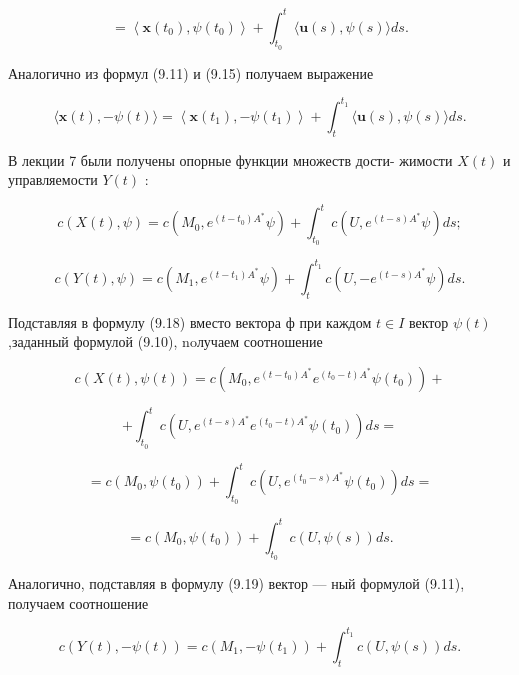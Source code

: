 \documentclass[8pt]{extarticle}
\begin{document}
\[
= \left\langle  {\mathbf{x}\left( {t}_{0}\right) ,\psi \left( {t}_{0}\right) }\right\rangle   + {\int }_{{t}_{0}}^{t}\langle \mathbf{u}\left( s\right) ,\psi \left( s\right) \rangle {ds}. \tag{9.16}
\]

Аналогично из формул (9.11) и (9.15) получаем выражение

\[
\langle \mathbf{x}\left( t\right) , - \psi \left( t\right) \rangle  = \left\langle  {\mathbf{x}\left( {t}_{1}\right) , - \psi \left( {t}_{1}\right) }\right\rangle   + {\int }_{t}^{{t}_{1}}\langle \mathbf{u}\left( s\right) ,\psi \left( s\right) \rangle {ds}. \tag{9.17}
\]

В лекции 7 были получены опорные функции множеств дости- жимости \(X\left( t\right)\) и управляемости \(Y\left( t\right)\) :

\[
c\left( {X\left( t\right) ,\psi }\right)  = c\left( {{M}_{0},{e}^{\left( {t - {t}_{0}}\right) {A}^{ * }}\psi }\right)  + {\int }_{{t}_{0}}^{t}c\left( {U,{e}^{\left( {t - s}\right) {A}^{ * }}\psi }\right) {ds}; \tag{9.18}
\]

\[
c\left( {Y\left( t\right) ,\psi }\right)  = c\left( {{M}_{1},{e}^{\left( {t - {t}_{1}}\right) {A}^{ * }}\psi }\right)  + {\int }_{t}^{{t}_{1}}c\left( {U, - {e}^{\left( {t - s}\right) {A}^{ * }}\psi }\right) {ds}. \tag{9.19}
\]

Подставляя в формулу (9.18) вместо вектора ф при каждом \(t \in  I\) вектор \(\psi \left( t\right)\) ,заданный формулой (9.10), noлучаем соотношение

\[
c\left( {X\left( t\right) ,\psi \left( t\right) }\right)  = c\left( {{M}_{0},{e}^{\left( {t - {t}_{0}}\right) {A}^{ * }}{e}^{\left( {{t}_{0} - t}\right) {A}^{ * }}\psi \left( {t}_{0}\right) }\right)  +
\]

\[
+ {\int }_{{t}_{0}}^{t}c\left( {U,{e}^{\left( {t - s}\right) {A}^{ * }}{e}^{\left( {{t}_{0} - t}\right) {A}^{ * }}\psi \left( {t}_{0}\right) }\right) {ds} =
\]

\[
= c\left( {{M}_{0},\psi \left( {t}_{0}\right) }\right)  + {\int }_{{t}_{0}}^{t}c\left( {U,{e}^{\left( {{t}_{0} - s}\right) {A}^{ * }}\psi \left( {t}_{0}\right) }\right) {ds} =
\]

\[
= c\left( {{M}_{0},\psi \left( {t}_{0}\right) }\right)  + {\int }_{{t}_{0}}^{t}c\left( {U,\psi \left( s\right) }\right) {ds}. \tag{9.20}
\]

Аналогично, подставляя в формулу (9.19) вектор — ный формулой (9.11), получаем соотношение

\[
c\left( {Y\left( t\right) , - \psi \left( t\right) }\right)  = c\left( {{M}_{1}, - \psi \left( {t}_{1}\right) }\right)  + {\int }_{t}^{{t}_{1}}c\left( {U,\psi \left( s\right) }\right) {ds}. \tag{9.21}
\]
\end{document}

